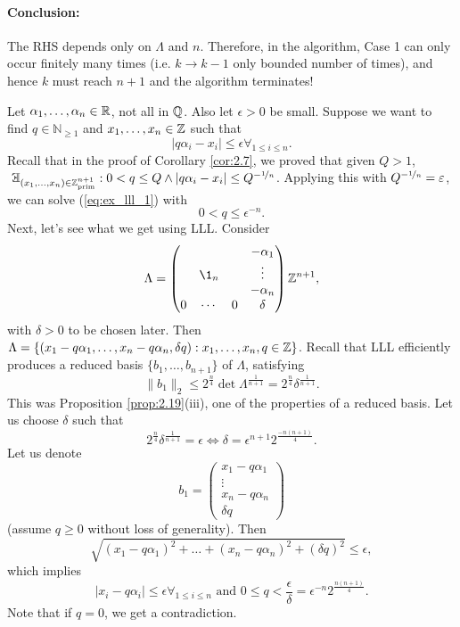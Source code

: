 \documentclass{Vorlesungstemplate_English} %
\renewcommand{\N}{\mathbb{N}_{\geq 1}}
\begin{document}
\paragraph{Conclusion:} The RHS depends only on $\Lambda$ and $n$. Therefore, in the algorithm, Case 1 can only occur finitely many times (i.e. $k \to k-1$ only bounded number of times), and hence $k$ must reach $n+1$ and the algorithm terminates!
\begin{example}
  Let $\alpha_1, \dots, \alpha_n \in \R$, not all in $\Q$. Also let $\epsilon > 0$ be small. Suppose we want to find $q \in \N$ and $x_1, \dots, x_n \in \Z$ such that \begin{equation}\label{eq:ex_lll_1}
    |q\alpha_i-x_i| \leq \epsilon \forall_{1 \leq i \leq n}. \tag{1}
  \end{equation}
  Recall that in the proof of Corollary \ref{cor:2.7}, we proved that given $Q > 1$, $\exists_{(x_1, \dots, x_n) \in \Zprim{n+1}}: 0 < q \leq Q \land |q\alpha_i-x_i| \leq Q^{-\nicefrac{1}{n}}$. Applying this with $Q^{-\nicefrac{1}{n}}=\epsilon$, we can solve (\ref{eq:ex_lll_1}) with \begin{equation}\label{eq:ex_lll_2} 0 < q \leq \epsilon^{-n}.\tag{2}\end{equation}
  Next, let's see what we get using LLL. Consider
  \begin{equation*}
    \Lambda = \begin{pmatrix}
      & & & -\alpha_1 \\
      & \1_n & & \vdots \\
      & & & -\alpha_n \\
      0 & \cdots & 0 & \delta
    \end{pmatrix}\Z^{n+1},
  \end{equation*}
  with $\delta > 0$ to be chosen later. Then $\Lambda = \{ (x_1-q\alpha_1, \dots, x_n-q\alpha_n, \delta q): x_1, \dots, x_n,q \in \Z\}$. Recall that LLL efficiently produces a reduced basis $\{ b_1, \dots, b_{n+1}\}$ of $\Lambda$, satisfying
  \[ \|b_1\|_2 \leq 2^{\frac{n}{4}}\det\Lambda^{\frac{1}{n+1}} = 2^{\frac{n}{4}}\delta^{\frac{1}{n+1}}.\]
  This was Proposition \ref{prop:2.19}(iii), one of the properties of a reduced basis. Let us choose $\delta$ such that
  \[ 2^{\frac{n}{4}}\delta^{\frac{1}{n+1}} = \epsilon \iff \delta = \epsilon^{n+1}2^{\frac{-n(n+1)}{4}}.\]
  Let us denote
  \[ b_1 = \begin{pmatrix}
    x_1-q\alpha_1 \\
    \vdots \\
    x_n-q\alpha_n \\
    \delta q
  \end{pmatrix}\]
  (assume $q \geq 0$ without loss of generality). Then
  \[ \sqrt{(x_1-q\alpha_1)^2+\dots+(x_n-q\alpha_n)^2+(\delta q)^2} \leq \epsilon,\]
  which implies
  \[ |x_i-q\alpha_i| \leq \epsilon \forall_{1 \leq i \leq n} \text{ and } 0 \leq q < \frac{\epsilon}{\delta} = \epsilon^{-n}2^{\frac{n(n+1)}{4}}.\]
  Note that if $q=0$, we get a contradiction.
\end{example}
\end{document}
